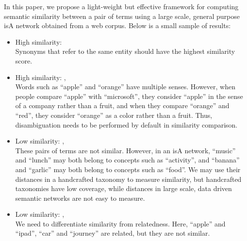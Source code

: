 In this paper, we propose a light-weight but effective framework for
computing semantic similarity %
between a pair of terms using a large scale, general purpose isA
network obtained from a web corpus.
Below is a small sample of results:

\begin{itemize}
\item High similarity: \\
  Synonyms that refer to the same entity should have the highest
  similarity score.
\item High similarity: ,
   \\
  Words such as ``apple'' and ``orange'' have multiple
  senses. However, when people compare ``apple'' with ``microsoft'',
  they consider ``apple'' in the sense of a company rather than a
  fruit, and when they compare ``orange'' and ``red'', they consider
  ``orange'' as a color rather than a fruit. Thus, disambiguation
  needs to be performed by default in similarity comparison.

\item Low similarity: ,  \\
  These pairs of terms are not similar. However, in an isA network,
  ``music'' and ``lunch'' may both belong to concepts such as
  ``activity'', and ``banana'' and ``garlic'' may both belong to concepts
  such as ``food''. We may use their distances in a handcrafted
  taxonomy to measure similarity, but handcrafted taxonomies have low
  coverage, while distances in large scale, data driven semantic
  networks are not easy to measure.

\item Low similarity: , \\
  We need to differentiate similarity from relatedness. Here,
  ``apple'' and ``ipad'', ``car'' and ``journey'' are related, but
  they are not similar.

\end{itemize}

